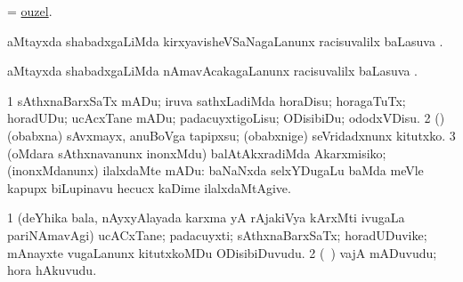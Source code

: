 \bentry
{}
\gl{\nA}
\bmng
= \hyperlink{ouzel}{ouzel}. 
\emng
\eentry

\bentry
{}
\gl{\uparx}
\bmng
{} aMtayxda shabadxgaLiMda kirxyavisheVSaNagaLanunx racisuvalilx baLasuva \uparx. 
\emng
\eentry

\bentry
{}
\gl{\uparx}
\bmng
{} aMtayxda shabadxgaLiMda nAmavAcakagaLanunx racisuvalilx baLasuva \uparx. 
\emng
\eentry

\bentry
{}
\gl{\sakirx}
\bmng
\bnum
\num{1} sAthxnaBarxSaTx mADu; iruva sathxLadiMda horaDisu; horagaTuTx; horadUDu; ucAcxTane mADu; padacuyxtigoLisu; ODisibiDu; ododxVDisu. 
\num{2} (\nAyxshA) (obabxna) sAvxmayx, anuBoVga tapipxsu; (obabxnige) seVridadxnunx kitutxko. 
\num{3} (oMdara sAthxnavanunx inonxMdu) balAtAkxradiMda Akarxmisiko; (inonxMdanunx) ilalxdaMte mADu:  baNaNxda selxYDugaLu baMda meVle kapupx biLupinavu hecucx kaDime ilalxdaMtAgive. 
\enum
\emng
\eentry

\bentry
{}
\gl{\nA}
\bmng
\bnum
\num{1} (deYhika bala, nAyxyAlayada karxma yA rAjakiVya kArxMti ivugaLa pariNAmavAgi) ucACxTane; padacuyxti; sAthxnaBarxSaTx; horadUDuvike; mAnayxte \mo vugaLanunx kitutxkoMDu ODisibiDuvudu. 
\num{2} (\kanmu\ \ame) vajA mADuvudu; hora hAkuvudu. 
\enum
\emng
\eentry

